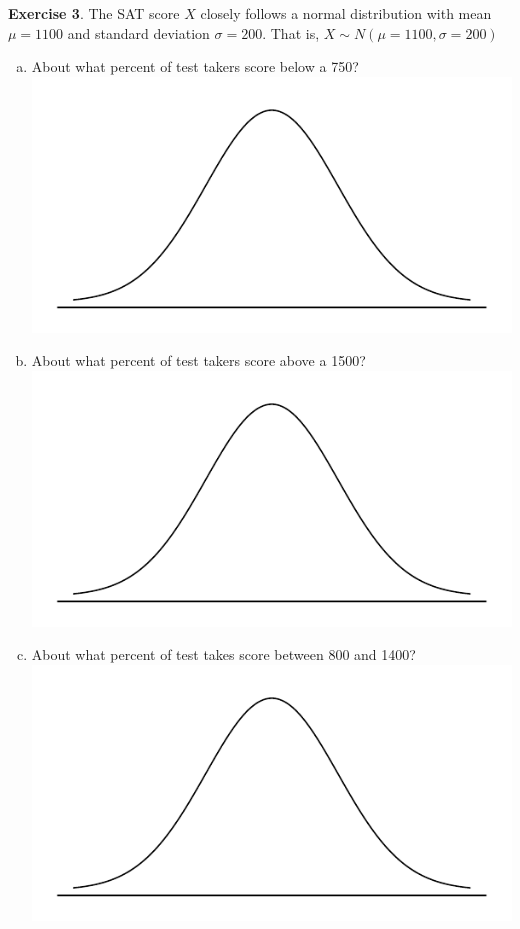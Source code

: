 \documentclass[11pt]{article}\usepackage[]{graphicx}\usepackage[]{color}
\begin{document}
\textbf{Exercise 3}.  The SAT score $X$ closely follows a normal distribution with mean $\mu=1100$ and standard deviation $\sigma = 200$.  That is, $X \sim N(\mu = 1100, \sigma = 200)$
\begin{enumerate}[(a)]
\item About what percent of test takers score below a 750?\\
\includegraphics[scale=0.6]{figure/norm_draw.pdf}
\vspace{1cm}

\item About what percent of test takers score above a 1500?\\
\includegraphics[scale=0.6]{figure/norm_draw.pdf}
\vspace{1cm}

\item About what percent of test takes score between 800 and 1400?\\
\includegraphics[scale=0.6]{figure/norm_draw.pdf}
\vspace{2cm}


\end{enumerate}
\end{document}
